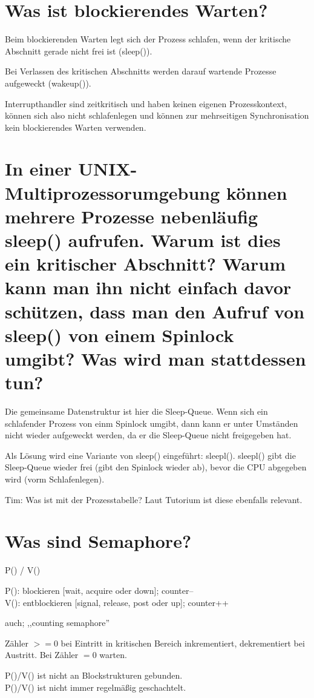 \documentclass[12pt,a4paper,ngerman]{scrartcl}
\newcommand{\question}[1]{#1}
\newenvironment {answer}
                {}
                {}
\begin{document}
\section{\question{Was ist blockierendes Warten?}}
\begin{answer}
Beim blockierenden Warten legt sich der Prozess schlafen, wenn der kritische Abschnitt gerade nicht frei ist (sleep()).

Bei Verlassen des kritischen Abschnitts werden darauf wartende Prozesse aufgeweckt (wakeup()).

Interrupthandler sind zeitkritisch und haben keinen eigenen Prozesskontext, können sich also nicht schlafenlegen und können zur mehrseitigen Synchronisation kein blockierendes Warten verwenden.
\end{answer}

\section{\question{In einer UNIX-Multiprozessorumgebung können mehrere Prozesse nebenläufig sleep() aufrufen. Warum ist dies ein kritischer Abschnitt? Warum kann man ihn nicht einfach davor schützen, dass man den Aufruf von sleep() von einem Spinlock umgibt? Was wird man stattdessen tun?}}
\begin{answer}
Die gemeinsame Datenstruktur ist hier die Sleep-Queue. Wenn sich ein schlafender Prozess von
einm Spinlock umgibt, dann kann er unter Umständen nicht wieder aufgeweckt werden, da er die
Sleep-Queue nicht freigegeben hat.

Als Lösung wird eine Variante von sleep() eingeführt: sleepl().
sleepl() gibt die Sleep-Queue wieder frei (gibt den Spinlock wieder ab), bevor die CPU abgegeben wird (vorm Schlafenlegen).

Tim: Was ist mit der Prozesstabelle? Laut Tutorium ist diese ebenfalls relevant.
\end{answer}

\section{\question{Was sind Semaphore?}}
\begin{answer}
P() / V()

P(): blockieren [wait, acquire oder down]; counter-- \\
V(): entblockieren [signal, release, post oder up]; counter++

auch; ,,counting semaphore''

Zähler $>= 0$ bei Eintritt in kritischen Bereich inkrementiert, dekrementiert bei Austritt. Bei Zähler $= 0$ warten.

P()/V() ist nicht an Blockstrukturen gebunden. \\
P()/V() ist nicht immer regelmäßig geschachtelt.
\end{answer}
\end{document}
